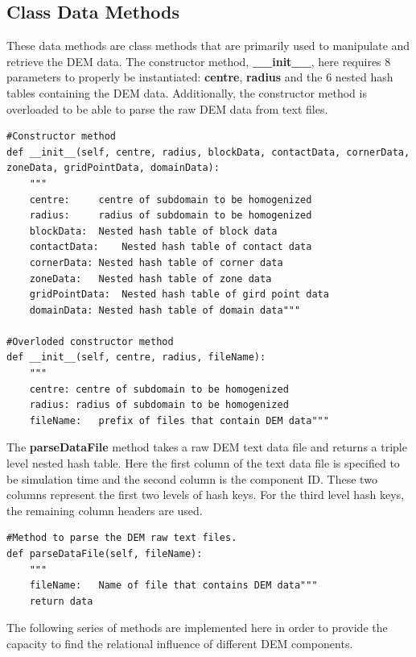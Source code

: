\subsection{Class Data Methods}

These data methods are class methods that are primarily used to manipulate and retrieve the DEM data. The constructor method, \textbf{\_\_init\_\_}, here requires 8 parameters to properly be instantiated: \textbf{centre}, \textbf{radius} and the 6 nested hash tables containing the DEM data. Additionally, the constructor method is overloaded to be able to parse the raw DEM data from text files.

\begin{lstlisting}[frame=single] 
#Constructor method
def __init__(self, centre, radius, blockData, contactData, cornerData, zoneData, gridPointData, domainData):
	"""
	centre:		centre of subdomain to be homogenized
	radius:		radius of subdomain to be homogenized
	blockData:	Nested hash table of block data
	contactData:	Nested hash table of contact data
	cornerData:	Nested hash table of corner data
	zoneData:	Nested hash table of zone data
	gridPointData:	Nested hash table of gird point data
	domainData:	Nested hash table of domain data"""
	
#Overloded constructor method
def __init__(self, centre, radius, fileName):
	"""
	centre:	centre of subdomain to be homogenized
	radius:	radius of subdomain to be homogenized
	fileName:	prefix of files that contain DEM data"""
\end{lstlisting}
	
The \textbf{parseDataFile} method takes a raw DEM text data file and returns a triple level nested hash table. Here the first column of the text data file is specified to be simulation time and the second column is the component ID. These two columns represent the first two levels of hash keys. For the third level hash keys, the remaining column headers are used. 
	
\begin{lstlisting}[frame=single] 
#Method to parse the DEM raw text files.
def parseDataFile(self, fileName):
	"""
	fileName:	Name of file that contains DEM data"""
	return data
\end{lstlisting}

The following series of methods are implemented here in order to provide the capacity to find the relational influence of different DEM components. 

